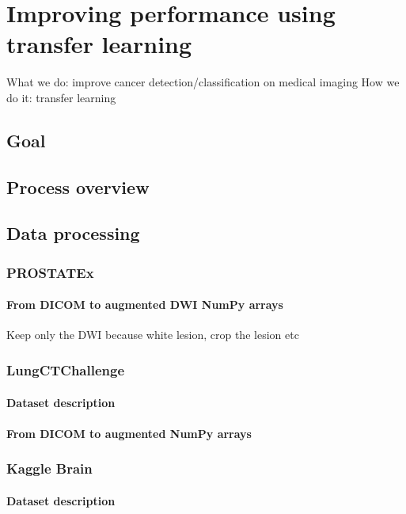 
\chapter{Improving performance using transfer learning}
\label{ch:transfer_learning}

What we do: improve cancer detection/classification on medical imaging
How we do it: transfer learning

\section{Goal}

\section{Process overview}


\section{Data processing}
\subsection{PROSTATEx}
\subsubsection{From DICOM to augmented DWI NumPy arrays}
Keep only the DWI because white lesion, crop the lesion etc

\subsection{LungCTChallenge}
\subsubsection{Dataset description}
\subsubsection{From DICOM to augmented NumPy arrays}

\subsection{Kaggle Brain}
\subsubsection{Dataset description}
